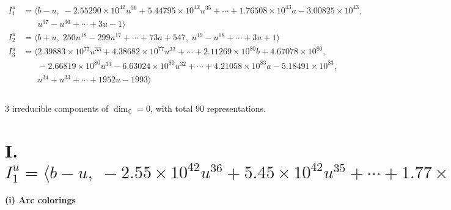 \documentclass[1p]{elsarticle_modified}
\theoremstyle{definition}
\begin{document}
\begin{align*}
I^u_{1}&=\langle 
b- u,\;-2.55290\times10^{42} u^{36}+5.44795\times10^{42} u^{35}+\cdots+1.76508\times10^{43} a-3.00825\times10^{43},\\
\phantom{I^u_{1}}&\phantom{= \langle  }u^{37}- u^{36}+\cdots+3 u-1\rangle \\
I^u_{2}&=\langle 
b+u,\;250 u^{18}-299 u^{17}+\cdots+73 a+547,\;u^{19}- u^{18}+\cdots+3 u+1\rangle \\
I^u_{3}&=\langle 
2.39883\times10^{77} u^{33}+4.38682\times10^{77} u^{32}+\cdots+2.11269\times10^{80} b+4.67078\times10^{80},\\
\phantom{I^u_{3}}&\phantom{= \langle  }-2.66819\times10^{80} u^{33}-6.63024\times10^{80} u^{32}+\cdots+4.21058\times10^{83} a-5.18491\times10^{83},\\
\phantom{I^u_{3}}&\phantom{= \langle  }u^{34}+u^{33}+\cdots+1952 u-1993\rangle \\
\\
\end{align*}
\raggedright * 3 irreducible components of $\dim_{\mathbb{C}}=0$, with total 90 representations.\\
\newpage
\renewcommand{\arraystretch}{1}
\centering \section*{I. $I^u_{1}= \langle b- u,\;-2.55\times10^{42} u^{36}+5.45\times10^{42} u^{35}+\cdots+1.77\times10^{43} a-3.01\times10^{43},\;u^{37}- u^{36}+\cdots+3 u-1 \rangle$}
\flushleft \textbf{(i) Arc colorings}\\
\end{document}
